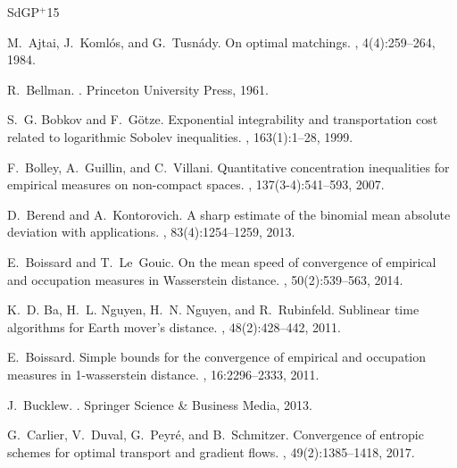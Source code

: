 \documentclass[sts]{imsart}
\begin{document}
\appendix

\newcommand{\etalchar}[1]{$^{#1}$}
\begin{thebibliography}{SdGP{\etalchar{+}}15}

M.~Ajtai, J.~Koml\'os, and G.~Tusn\'ady.
\newblock On optimal matchings.
, 4(4):259--264, 1984.

R.~Bellman.
.
\newblock Princeton University Press, 1961.

S.~G. Bobkov and F.~G\"otze.
\newblock Exponential integrability and transportation cost related to
  logarithmic {S}obolev inequalities.
, 163(1):1--28, 1999.

F.~Bolley, A.~Guillin, and C.~Villani.
\newblock Quantitative concentration inequalities for empirical measures on
  non-compact spaces.
, 137(3-4):541--593, 2007.

D.~Berend and A.~Kontorovich.
\newblock A sharp estimate of the binomial mean absolute deviation with
  applications.
, 83(4):1254--1259, 2013.

E.~Boissard and T.~Le~Gouic.
\newblock On the mean speed of convergence of empirical and occupation measures
  in {W}asserstein distance.
, 50(2):539--563,
  2014.

K.~D. Ba, H.~L. Nguyen, H.~N. Nguyen, and R.~Rubinfeld.
\newblock Sublinear time algorithms for {E}arth mover's distance.
, 48(2):428--442, 2011.

E.~Boissard.
\newblock Simple bounds for the convergence of empirical and occupation
  measures in 1-wasserstein distance.
, 16:2296--2333, 2011.

J.~Bucklew.
.
\newblock Springer Science \& Business Media, 2013.

G.~Carlier, V.~Duval, G.~Peyr\'e, and B.~Schmitzer.
\newblock Convergence of entropic schemes for optimal transport and gradient
  flows.
, 49(2):1385--1418, 2017.


\end{thebibliography}
\end{document}
